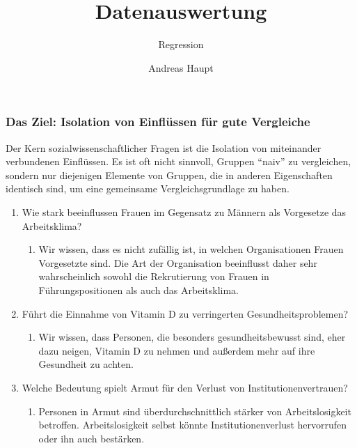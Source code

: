 \documentclass[18pt,handout, aspectratio=169]{beamer}
\title{Datenauswertung}
\subtitle{Regression}
\author{Andreas Haupt}
\institute{Karlsruher Institut für Technologie}
\date{}
\begin{document}

\begin{frame}
\titlepage
\end{frame}

\begin{frame}
\frametitle{Das Ziel: Isolation von Einflüssen für gute Vergleiche}
\small

Der Kern sozialwissenschaftlicher Fragen ist die Isolation von miteinander verbundenen Einflüssen. Es ist oft nicht sinnvoll, Gruppen ``naiv'' zu vergleichen, sondern nur diejenigen Elemente von Gruppen, die in anderen Eigenschaften identisch sind, um eine gemeinsame Vergleichsgrundlage zu haben. \vfill 

\begin{enumerate}
  \item Wie stark beeinflussen Frauen im Gegensatz zu Männern als Vorgesetze das Arbeitsklima? 
  \begin{enumerate}
    \item[] Wir wissen, dass es nicht zufällig ist, in welchen Organisationen Frauen Vorgesetzte sind. Die Art der Organisation beeinflusst daher sehr wahrscheinlich sowohl die Rekrutierung von Frauen in Führungspositionen als auch das Arbeitsklima. 
  \end{enumerate}
  \pause
  \item Führt die Einnahme von Vitamin D zu verringerten Gesundheitsproblemen? 
  \begin{enumerate}
    \item[] Wir wissen, dass Personen, die besonders gesundheitsbewusst sind, eher dazu neigen, Vitamin D zu nehmen und außerdem mehr auf ihre Gesundheit zu achten. 
  \end{enumerate}
  \pause
  \item Welche Bedeutung spielt Armut für den Verlust von Institutionenvertrauen? 
  \begin{enumerate}
    \item[] Personen in Armut sind überdurchschnittlich stärker von Arbeitslosigkeit betroffen. Arbeitslosigkeit selbst könnte Institutionenverlust hervorrufen oder ihn auch bestärken. 
  \end{enumerate}
\end{enumerate}

\end{frame}
\end{document}
